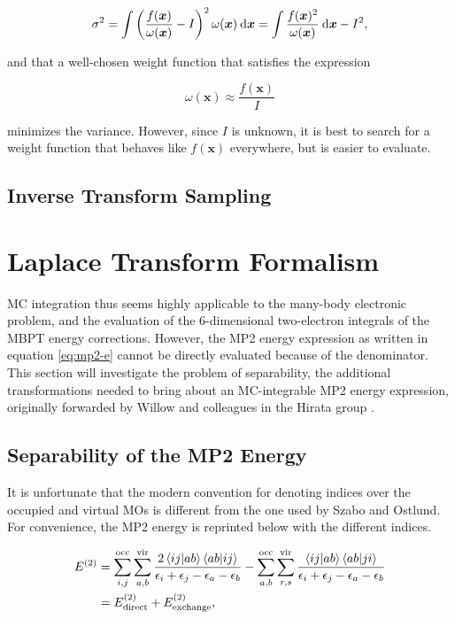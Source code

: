 \begin{equation}
	\sigma^2 = \int \left( \frac{f(\bm x)}{\omega(\bm x)} - I \right)^2 \omega(\bm x) \:\mathrm{d} \bm x
	= \int \frac{f(\bm x)^2}{\omega(\bm x)} \:\mathrm{d}\bm x - I^2,
\end{equation}

\noindent and that a well-chosen weight function that satisfies the expression

\begin{equation}
	\omega(\bm x) \approx \frac{f(\bm x)}{I}
\end{equation}

\noindent minimizes the variance. However, since $I$ is unknown, it is best to
search for a weight function that behaves like $f(\bm x)$ everywhere, but is
easier to evaluate.

\subsection{Inverse Transform Sampling}

\section{Laplace Transform Formalism}
\label{s:laplace}

MC integration thus seems highly applicable to the many-body electronic problem,
and the evaluation of the 6-dimensional two-electron integrals of the MBPT
energy corrections. However, the MP2 energy expression as written in equation
\ref{eq:mp2-e} cannot be directly evaluated because of the denominator. This
section will investigate the problem of separability, the additional
transformations needed to bring about an MC-integrable MP2 energy expression,
originally forwarded by Willow and colleagues in the Hirata group \cite{willow1,
willow2}.

\subsection{Separability of the MP2 Energy}

It is unfortunate that the modern convention for denoting indices over the
occupied and virtual MOs is different from the one used by Szabo and Ostlund.
For convenience, the MP2 energy is reprinted below with the different indices.

\begin{equation}
\begin{split}
	\perturbE[]{2} &=
	\sum_{i,j}^{\text{occ}} \sum_{a,b}^{\text{vir}}
	\frac{2\braket{ij|ab}\braket{ab|ij}}{\eps_i + \eps_j - \eps_a -\eps_b}
	-
	\sum_{a,b}^{\text{occ}} \sum_{r,s}^{\text{vir}}
	\frac{\braket{ij|ab}\braket{ab|ji}}{\eps_i + \eps_j - \eps_a -\eps_b}
	\\
	&= \perturbE[\text{direct}]{2} + \perturbE[\text{exchange}]{2},
	\label{eq:mp2-ee}
\end{split}
\end{equation}

